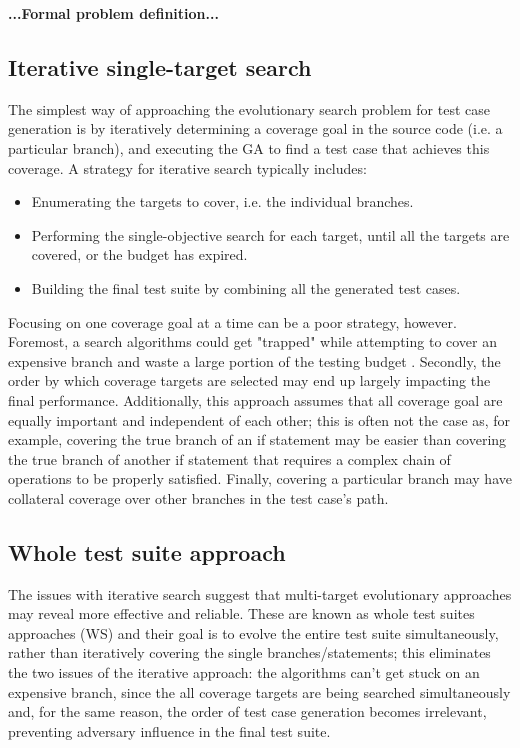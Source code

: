 \textbf{...Formal problem definition...}



\subsection{Iterative single-target search}
The simplest way of approaching the evolutionary search problem for test case generation is by iteratively determining a coverage goal in the source code (i.e. a particular branch), and executing the GA to find a test case that achieves this coverage. 
A strategy for iterative search typically includes:
\begin{itemize}
    \item Enumerating the targets to cover, i.e. the individual branches.
    \item Performing the single-objective search for each target, until all the targets are covered, or the budget has expired.
    \item Building the final test suite by combining all the generated test cases.
\end{itemize}

Focusing on one coverage goal at a time can be a poor strategy, however. Foremost, a search algorithms could get "trapped" while attempting to cover an expensive branch and waste a large portion of the testing budget \cite{DBLP:journals/tse/FraserA13}.
Secondly, the order by which coverage targets are selected may end up largely impacting the final performance.
Additionally, this approach assumes that all coverage goal are equally important and independent of each other; this is often not the case as, for example, covering the true branch of an if statement may be easier than covering the true branch of another if statement that requires a complex chain of operations to be properly satisfied. Finally, covering a particular branch may have collateral coverage over other branches in the test case's path.



\subsection{Whole test suite approach}
The issues with iterative search suggest that multi-target evolutionary approaches may reveal more effective and reliable. These are known as whole test suites approaches (WS) \cite{QSIC11} and their goal is to evolve the entire test suite simultaneously, rather than iteratively covering the single branches/statements; this eliminates the two issues of the iterative approach: the algorithms can't get stuck on an expensive branch, since the all coverage targets are being searched simultaneously and, for the same reason, the order of test case generation becomes irrelevant, preventing adversary influence in the final test suite.


